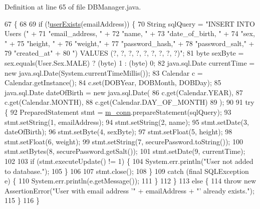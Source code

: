 Definition at line 65 of file D\+B\+Manager.\+java.


\begin{DoxyCode}
67                                                                                                         \{
68 
69         \textcolor{keywordflow}{if} (!\mbox{\hyperlink{classcom_1_1activitytracker_1_1_d_b_manager_af05d79f33ecf2920a67d1b9cf82c079f}{userExists}}(emailAddress)) \{
70             String sqlQuery = \textcolor{stringliteral}{"INSERT INTO Users ("} +
71                     \textcolor{stringliteral}{"email\_address, "} +
72                     \textcolor{stringliteral}{"name, "} +
73                     \textcolor{stringliteral}{"date\_of\_birth, "} +
74                     \textcolor{stringliteral}{"sex, "} +
75                     \textcolor{stringliteral}{"height, "} +
76                     \textcolor{stringliteral}{"weight,"} +
77                     \textcolor{stringliteral}{"password\_hash,"} +
78                     \textcolor{stringliteral}{"password\_salt,"} +
79                     \textcolor{stringliteral}{"created\_at"} +
80                     \textcolor{stringliteral}{") VALUES (?, ?, ?, ?, ?, ?, ?, ?, ?)"};
81             byte sexByte = sex.equals(User.Sex.MALE) ? (byte) 1 : (byte) 0;
82             java.sql.Date currentTime = \textcolor{keyword}{new} java.sql.Date(System.currentTimeMillis());
83             Calendar c = Calendar.getInstance();
84             c.set(DOBYear, DOBMonth, DOBDay);
85             java.sql.Date dateOfBirth = \textcolor{keyword}{new} java.sql.Date(
86                     c.get(Calendar.YEAR),
87                     c.get(Calendar.MONTH),
88                     c.get(Calendar.DAY\_OF\_MONTH)
89             );
90 
91             \textcolor{keywordflow}{try} \{
92                 PreparedStatement stmt = \mbox{\hyperlink{classcom_1_1activitytracker_1_1_d_b_manager_a064088d13ac09eb147fdc19268771521}{m\_conn}}.prepareStatement(sqlQuery);
93                 stmt.setString(1, emailAddress);
94                 stmt.setString(2, name);
95                 stmt.setDate(3, dateOfBirth);
96                 stmt.setByte(4, sexByte);
97                 stmt.setFloat(5, height);
98                 stmt.setFloat(6, weight);
99                 stmt.setString(7, securePassword.toString());
100                 stmt.setBytes(8, securePassword.getSalt());
101                 stmt.setDate(9, currentTime);
102 
103                 \textcolor{keywordflow}{if} (stmt.executeUpdate() != 1) \{
104                     System.err.println(\textcolor{stringliteral}{"User not added to database."});
105                 \}
106 
107                 stmt.close();
108             \}
109             \textcolor{keywordflow}{catch} (\textcolor{keyword}{final} SQLException e) \{
110                 System.err.println(e.getMessage());
111             \}
112         \}
113         \textcolor{keywordflow}{else} \{
114             \textcolor{keywordflow}{throw} \textcolor{keyword}{new} AssertionError(\textcolor{stringliteral}{"User with email address '"} + emailAddress + \textcolor{stringliteral}{"' already exists."});
115         \}
116     \}
\end{DoxyCode}
